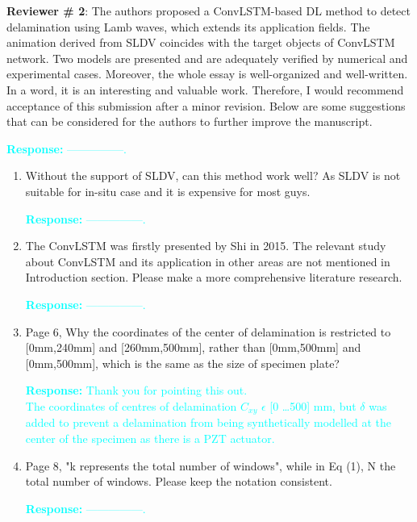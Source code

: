 \documentclass[11pt,a2paper]{report}
\begin{document}
\newpage 
\textbf{Reviewer \# 2}:
\newline The authors proposed a ConvLSTM-based DL method to detect delamination 
using Lamb waves, which extends its application fields. The animation derived 
from SLDV coincides with the target objects of ConvLSTM network. Two models are 
presented and are adequately verified by numerical and experimental cases. 
Moreover, the whole essay is well-organized and well-written. In a word, it is 
an interesting and valuable work. Therefore, I would recommend acceptance of 
this submission after a minor revision. Below are some suggestions that can be 
considered for the authors to further improve the manuscript.

\textcolor{Cyan}{
	\newline\textbf{Response:}
	---------------.
}
\begin{enumerate}
	\item Without the support of SLDV, can this method work well? As SLDV is 
	not suitable for in-situ case and it is expensive for most guys.
	
	\textcolor{Cyan}{
		\textbf{Response:}
		---------------.
	}
	
	\item The ConvLSTM was firstly presented by Shi in 2015. The relevant study 
	about ConvLSTM and its application in other areas are not mentioned in 
	Introduction section. Please make a more comprehensive literature research.
	
	\textcolor{Cyan}{
		\textbf{Response:}
		---------------.
	}
	\item Page 6, Why the coordinates of the center of delamination is 
	restricted to [0mm,240mm] and [260mm,500mm], rather than [0mm,500mm] and 
	[0mm,500mm], which is the same as the size of specimen plate?
	
	\textcolor{Cyan}{
		\textbf{Response:}
		Thank you for pointing this out.\\
		The coordinates of centres of delamination \(C_{xy}\) $\epsilon$ [0 \dots 500] mm, but $\delta$ was added to prevent a delamination from being synthetically modelled at the center of the specimen as there is a PZT actuator.
	}
	
	\item Page 8, "k represents the total number of windows", while in Eq (1), 
	N the total number of windows. Please keep the notation consistent.
	
	\textcolor{Cyan}{
		\textbf{Response:}
		---------------.
	}	
	

\end{enumerate}
\end{document}
